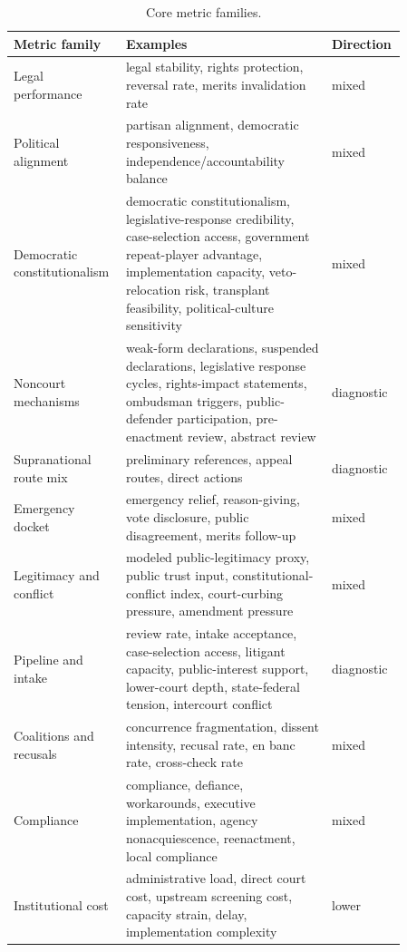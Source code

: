 \documentclass[
  journal=small,
  manuscript=research-article,
  year=2026
]{cup-journal}
\begin{document}
\begin{table}[hbt!]
\centering
\caption{Core metric families.}
\label{tab:metrics}
\begin{tabular}{@{}p{0.23\linewidth}p{0.50\linewidth}p{0.13\linewidth}@{}}
\toprule
Metric family & Examples & Direction \\
\midrule
Legal performance & legal stability, rights protection, reversal rate, merits invalidation rate & mixed \\
Political alignment & partisan alignment, democratic responsiveness, independence/accountability balance & mixed \\
Democratic constitutionalism & democratic constitutionalism, legislative-response credibility, case-selection access, government repeat-player advantage, implementation capacity, veto-relocation risk, transplant feasibility, political-culture sensitivity & mixed \\
Noncourt mechanisms & weak-form declarations, suspended declarations, legislative response cycles, rights-impact statements, ombudsman triggers, public-defender participation, pre-enactment review, abstract review & diagnostic \\
Supranational route mix & preliminary references, appeal routes, direct actions & diagnostic \\
Emergency docket & emergency relief, reason-giving, vote disclosure, public disagreement, merits follow-up & mixed \\
Legitimacy and conflict & modeled public-legitimacy proxy, public trust input, constitutional-conflict index, court-curbing pressure, amendment pressure & mixed \\
Pipeline and intake & review rate, intake acceptance, case-selection access, litigant capacity, public-interest support, lower-court depth, state-federal tension, intercourt conflict & diagnostic \\
Coalitions and recusals & concurrence fragmentation, dissent intensity, recusal rate, en banc rate, cross-check rate & mixed \\
Compliance & compliance, defiance, workarounds, executive implementation, agency nonacquiescence, reenactment, local compliance & mixed \\
Institutional cost & administrative load, direct court cost, upstream screening cost, capacity strain, delay, implementation complexity & lower \\
\bottomrule
\end{tabular}
\end{table}
\end{document}
